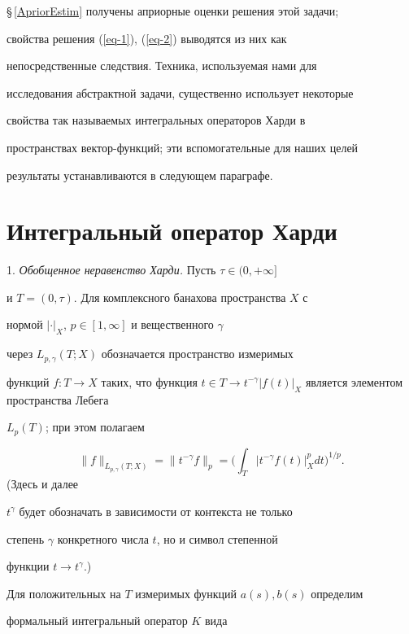 \S\,\ref{ApriorEstim} получены априорные оценки решения этой задачи;


свойства решения (\ref{eq-1}), (\ref{eq-2}) выводятся из них как


непосредственные следствия. Техника, используемая нами для


исследования абстрактной задачи, существенно использует некоторые


свойства так называемых интегральных операторов Харди в


пространствах вектор-функций; эти вспомогательные для наших целей


результаты устанавливаются в следующем параграфе.





\section{Интегральный оператор Харди} \label{Hardi}





1. {\it Обобщенное неравенство Харди.} Пусть $\tau\in (0,+\infty]$


и $T=(0,\tau)$. Для комплексного банахова пространства $X$ с


нормой $|\cdot|_X$, $p \in [1,\infty]$ и вещественного $\gamma$


через $L_{p,\gamma}(T;X)$ обозначается пространство измеримых


функций $f : T \to X$ таких, что функция $t \in T \to


t^{-\gamma}|f(t)|_X$ является элементом пространства Лебега


$L_p(T)$; при этом полагаем


$$


\|f\|_{L_{p,\gamma}(T;X)}=\|t^{-\gamma}f\|_p=\bigg(\int_T


|t^{-\gamma} f(t)|_X^p d t \bigg)^{1/p}.


$$ (Здесь и далее


$t^\gamma$ будет обозначать в зависимости от контекста не только


степень $\gamma$ конкретного числа $t$, но и символ степенной


функции $t \to t^\gamma$.)





Для положительных на $T$ измеримых функций $a(s),b(s)$ определим


формальный интегральный оператор $K$ вида


